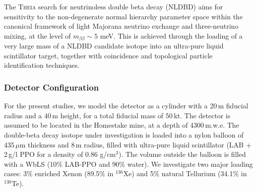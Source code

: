 %
%
%
%
%

The \textsc{Theia} search for neutrinoless double beta decay (NLDBD) aims for
sensitivity to the non-degenerate normal hierarchy parameter space
within the canonical framework of light Majorana neutrino exchange and
three-neutrino mixing, at the level of $m_{\beta\beta}\sim5$ meV.
This is achieved through the loading of a very large
mass of a NLDBD candidate isotope into an ultra-pure liquid scintillator
target, together with coincidence and topological particle identification
techniques.

\subsubsection{Detector Configuration}

For the present studies, we model the detector as a cylinder with a 20\,m fiducial radius and a 40\,m height, for a total fiducial mass of 50\,kt. The detector is assumed to be located in the Homestake mine, at a depth of 4300\,m.w.e. The double-beta decay isotope under investigation is loaded into a nylon balloon of 435\,$\mu$m thickness and 8\,m radius, filled with ultra-pure liquid scintillator (LAB + 2\,g/l PPO for a density of 0.86 g/cm$^3$). The volume outside the balloon is filled with a WbLS (10\% LAB-PPO and 90\% water). We investigate two major loading cases: 3\% enriched Xenon (89.5\% in $^{136}$Xe) and 5\% natural Tellurium (34.1\% in $^{130}$Te).

